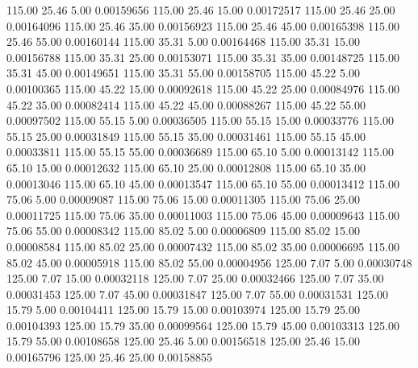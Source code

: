     115.00     25.46      5.00     0.00159656
    115.00     25.46     15.00     0.00172517
    115.00     25.46     25.00     0.00164096
    115.00     25.46     35.00     0.00156923
    115.00     25.46     45.00     0.00165398
    115.00     25.46     55.00     0.00160144
    115.00     35.31      5.00     0.00164468
    115.00     35.31     15.00     0.00156788
    115.00     35.31     25.00     0.00153071
    115.00     35.31     35.00     0.00148725
    115.00     35.31     45.00     0.00149651
    115.00     35.31     55.00     0.00158705
    115.00     45.22      5.00     0.00100365
    115.00     45.22     15.00     0.00092618
    115.00     45.22     25.00     0.00084976
    115.00     45.22     35.00     0.00082414
    115.00     45.22     45.00     0.00088267
    115.00     45.22     55.00     0.00097502
    115.00     55.15      5.00     0.00036505
    115.00     55.15     15.00     0.00033776
    115.00     55.15     25.00     0.00031849
    115.00     55.15     35.00     0.00031461
    115.00     55.15     45.00     0.00033811
    115.00     55.15     55.00     0.00036689
    115.00     65.10      5.00     0.00013142
    115.00     65.10     15.00     0.00012632
    115.00     65.10     25.00     0.00012808
    115.00     65.10     35.00     0.00013046
    115.00     65.10     45.00     0.00013547
    115.00     65.10     55.00     0.00013412
    115.00     75.06      5.00     0.00009087
    115.00     75.06     15.00     0.00011305
    115.00     75.06     25.00     0.00011725
    115.00     75.06     35.00     0.00011003
    115.00     75.06     45.00     0.00009643
    115.00     75.06     55.00     0.00008342
    115.00     85.02      5.00     0.00006809
    115.00     85.02     15.00     0.00008584
    115.00     85.02     25.00     0.00007432
    115.00     85.02     35.00     0.00006695
    115.00     85.02     45.00     0.00005918
    115.00     85.02     55.00     0.00004956
    125.00      7.07      5.00     0.00030748
    125.00      7.07     15.00     0.00032118
    125.00      7.07     25.00     0.00032466
    125.00      7.07     35.00     0.00031453
    125.00      7.07     45.00     0.00031847
    125.00      7.07     55.00     0.00031531
    125.00     15.79      5.00     0.00104411
    125.00     15.79     15.00     0.00103974
    125.00     15.79     25.00     0.00104393
    125.00     15.79     35.00     0.00099564
    125.00     15.79     45.00     0.00103313
    125.00     15.79     55.00     0.00108658
    125.00     25.46      5.00     0.00156518
    125.00     25.46     15.00     0.00165796
    125.00     25.46     25.00     0.00158855
